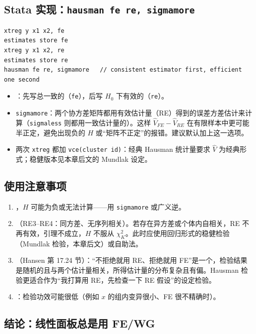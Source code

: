 \subsection{Stata 实现：\texttt{hausman fe re, sigmamore}}

\begin{lstlisting}
xtreg y x1 x2, fe
estimates store fe
xtreg y x1 x2, re
estimates store re
hausman fe re, sigmamore   // consistent estimator first, efficient one second
\end{lstlisting}
\begin{itemize}
  \item {}：先写总一致的（\texttt{fe}），后写 $H_0$ 下有效的（\texttt{re}）。
  \item \texttt{sigmamore}：两个协方差矩阵都用有效估计量（RE）得到的误差方差估计来计算（\texttt{sigmaless} 则都用一致估计量的）。这样 $\hat V_{FE}-\hat V_{RE}$ 在有限样本中更可能半正定，避免出现负的 $H$ 或“矩阵不正定”的报错。建议默认加上这一选项。
  \item 两次 \texttt{xtreg} 都加 \texttt{vce(cluster id)}：经典 Hausman 统计量要求 $\hat V$ 为经典形式；稳健版本见本章后文的 Mundlak 设定。
\end{itemize}

\subsection{使用注意事项}

\begin{enumerate}
  \item {}，$H$ 可能为负或无法计算——用 \texttt{sigmamore} 或广义逆。
  \item {}（RE3–RE4：同方差、无序列相关）。若存在异方差或个体内自相关，RE 不再有效，引理不成立，$H$ 不服从 $\chi^2_K$。此时应使用回归形式的稳健检验（Mundlak 检验，本章后文）或自助法。
  \item {}（Hansen 第 17.24 节）：“不拒绝就用 RE、拒绝就用 FE”是一个，检验结果是随机的且与两个估计量相关，所得估计量的分布复杂且有偏。Hausman 检验更适合作为“我打算用 RE，先检查一下 RE 假设”的设定检验。
  \item {}：检验功效可能很低（例如 $x$ 的组内变异很小、FE 很不精确时）。
\end{enumerate}

\subsection{结论：线性面板总是用 FE/WG}

